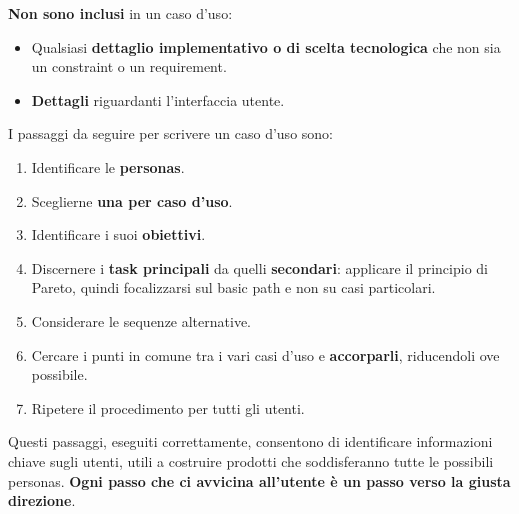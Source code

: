 \textbf{Non sono inclusi} in un caso d'uso:
\begin{itemize}
	\itemsep-0.3em
	\item Qualsiasi \textbf{dettaglio implementativo o di scelta tecnologica} che non sia un constraint o un requirement.
	\item \textbf{Dettagli} riguardanti l'interfaccia utente.
\end{itemize}

I passaggi da seguire per scrivere un caso d'uso sono:

\begin{enumerate}
	\itemsep-0.3em
	\item Identificare le \textbf{personas}.
	\item Sceglierne \textbf{una per caso d'uso}.
	\item Identificare i suoi \textbf{obiettivi}.
	\item Discernere i \textbf{task principali} da quelli \textbf{secondari}: applicare il principio di Pareto, quindi focalizzarsi sul basic path e
	non su casi particolari.
	\item Considerare le sequenze alternative.
	\item Cercare i punti in comune tra i vari casi d'uso e \textbf{accorparli}, riducendoli ove possibile.
	\item Ripetere il procedimento per tutti gli utenti.
\end{enumerate}

Questi passaggi, eseguiti correttamente, consentono di identificare informazioni chiave sugli utenti, utili a costruire prodotti che soddisferanno
tutte le possibili personas. \textbf{Ogni passo che ci avvicina all'utente è un passo verso la giusta direzione}.
